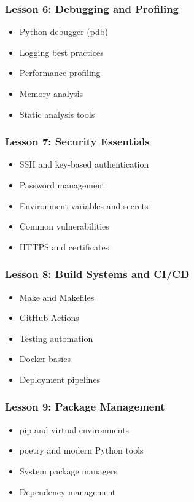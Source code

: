 \documentclass[11pt,letterpaper]{article}
\begin{document}
\subsubsection{Lesson 6: Debugging and Profiling}
\begin{itemize}[leftmargin=*]
    \item Python debugger (pdb)
    \item Logging best practices
    \item Performance profiling
    \item Memory analysis
    \item Static analysis tools
\end{itemize}

\subsubsection{Lesson 7: Security Essentials}
\begin{itemize}[leftmargin=*]
    \item SSH and key-based authentication
    \item Password management
    \item Environment variables and secrets
    \item Common vulnerabilities
    \item HTTPS and certificates
\end{itemize}

\subsubsection{Lesson 8: Build Systems and CI/CD}
\begin{itemize}[leftmargin=*]
    \item Make and Makefiles
    \item GitHub Actions
    \item Testing automation
    \item Docker basics
    \item Deployment pipelines
\end{itemize}

\subsubsection{Lesson 9: Package Management}
\begin{itemize}[leftmargin=*]
    \item pip and virtual environments
    \item poetry and modern Python tools
    \item System package managers
    \item Dependency management
\end{itemize}
\end{document}
